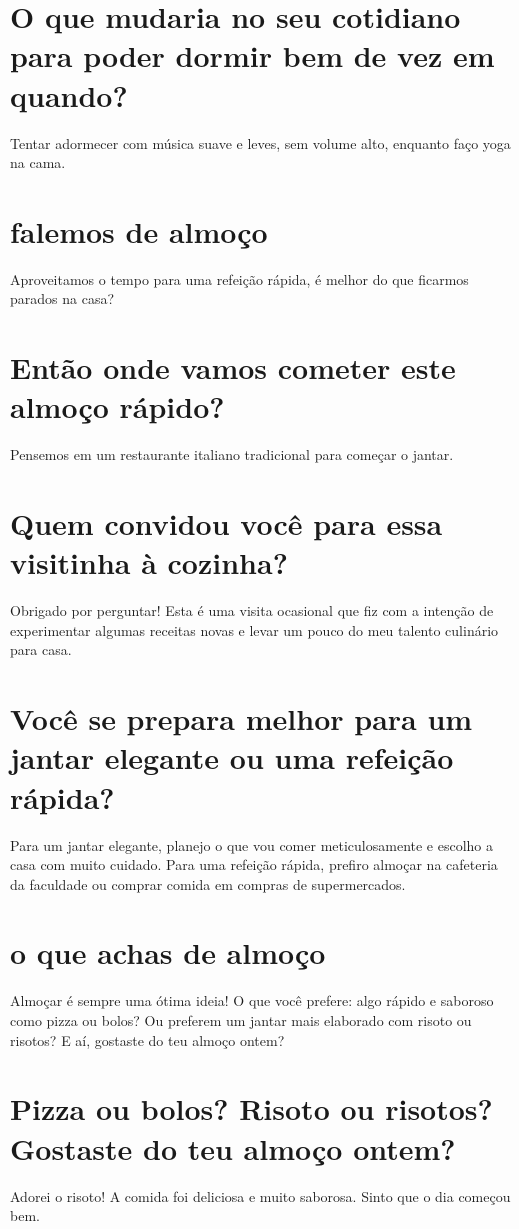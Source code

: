 \documentclass[11pt,a4paper]{article}
\begin{document}
\section{O que mudaria no seu cotidiano para poder dormir bem de vez em quando?}
Tentar adormecer com música suave e leves, sem volume alto, enquanto faço yoga na cama.

\section{falemos de almoço}
Aproveitamos o tempo para uma refeição rápida, é melhor do que ficarmos parados na casa?

\section{Então onde vamos cometer este almoço rápido?}
Pensemos em um restaurante italiano tradicional para começar o jantar.

\section{Quem convidou você para essa visitinha à cozinha?}
Obrigado por perguntar! Esta é uma visita ocasional que fiz com a intenção de experimentar algumas receitas novas e levar um pouco do meu talento culinário para casa.

\section{Você se prepara melhor para um jantar elegante ou uma refeição rápida?}
Para um jantar elegante, planejo o que vou comer meticulosamente e escolho a casa com muito cuidado. Para uma refeição rápida, prefiro almoçar na cafeteria da faculdade ou comprar comida em compras de supermercados.

\section{o que achas de almoço}
Almoçar é sempre uma ótima ideia! O que você prefere: algo rápido e saboroso como pizza ou bolos? Ou preferem um jantar mais elaborado com risoto ou risotos? E aí, gostaste do teu almoço ontem?

\section{Pizza ou bolos? Risoto ou risotos? Gostaste do teu almoço ontem?}
Adorei o risoto! A comida foi deliciosa e muito saborosa. Sinto que o dia começou bem.
\end{document}
